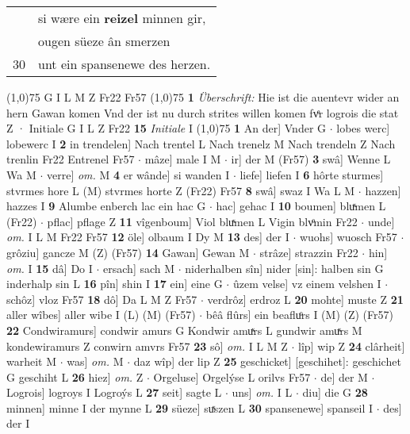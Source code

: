 \documentclass[8pt,a4paper,notitlepage]{article}
\begin{document}
\begin{table}[ht]
\begin{minipage}[t]{0.5\linewidth}
\begin{tabular}{rl}
 & si wære ein \textbf{reizel} minnen gir,\\ 
 & ougen süeze ân smerzen\\ 
30 & unt ein spansenewe des herzen.\\ 
\end{tabular}
\scriptsize
\line(1,0){75} \newline
G I L M Z Fr22 Fr57 \newline
\line(1,0){75} \newline
\textbf{1} \textit{Überschrift:} Hie ist die auentevr wider an hern Gawan komen Vnd der ist nu durch strites willen komen fvͤr logrois die stat Z  · Initiale G I L Z Fr22  \textbf{15} \textit{Initiale} I  \newline
\line(1,0){75} \newline
\textbf{1} An der] Vnder G  $\cdot$ lobes werc] lobewerc I \textbf{2} in trendelen] Nach trentel L Nach trenelz M Nach trendeln Z Nach trenlin Fr22 Entrenel Fr57  $\cdot$ mâze] male I M  $\cdot$ ir] der M (Fr57) \textbf{3} swâ] Wenne L Wa M  $\cdot$ verre] \textit{om.} M \textbf{4} er wânde] si wanden I  $\cdot$ liefe] liefen I \textbf{6} hôrte sturmes] stvrmes hore L (M) stvrmes horte Z (Fr22) Fr57 \textbf{8} swâ] swaz I Wa L M  $\cdot$ hazzen] hazzes I \textbf{9} Alumbe enberch lac ein hac G  $\cdot$ hac] gehac I \textbf{10} boumen] bluͯmen L (Fr22)  $\cdot$ pflac] pflage Z \textbf{11} vîgenboum] Viol bluͯmen L Vigin blvͦmin Fr22  $\cdot$ unde] \textit{om.} I L M Fr22 Fr57 \textbf{12} öle] olbaum I Dy M \textbf{13} des] der I  $\cdot$ wuohs] wuosch Fr57  $\cdot$ grôziu] gancze M (Z) (Fr57) \textbf{14} Gawan] Gewan M  $\cdot$ strâze] strazzin Fr22  $\cdot$ hin] \textit{om.} I \textbf{15} dâ] Do I  $\cdot$ ersach] sach M  $\cdot$ niderhalben sîn] nider [sin]: halben sin G inderhalp sin L \textbf{16} pîn] shin I \textbf{17} ein] eine G  $\cdot$ ûzem velse] vz einem velshen I  $\cdot$ schôz] vloz Fr57 \textbf{18} dô] Da L M Z Fr57  $\cdot$ verdrôz] erdroz L \textbf{20} mohte] muste Z \textbf{21} aller wîbes] aller wibe I (L) (M) (Fr57)  $\cdot$ bêâ flûrs] ein beafluͦrs I (M) (Z) (Fr57) \textbf{22} Condwiramurs] condwir amurs G Kondwir amuͯrs L gundwir amuͯrs M kondewiramurs Z conwirn amvrs Fr57 \textbf{23} sô] \textit{om.} I L M Z  $\cdot$ lîp] wip Z \textbf{24} clârheit] warheit M  $\cdot$ was] \textit{om.} M  $\cdot$ daz wîp] der lip Z \textbf{25} geschicket] [geschihet]: geschichet G geschiht L \textbf{26} hiez] \textit{om.} Z  $\cdot$ Orgeluse] Orgelýse L orilvs Fr57  $\cdot$ de] der M  $\cdot$ Logrois] logroys I Logroýs L \textbf{27} seit] sagte L  $\cdot$ uns] \textit{om.} I L  $\cdot$ diu] die G \textbf{28} minnen] minne I der mynne L \textbf{29} süeze] suͯszen L \textbf{30} spansenewe] spanseil I  $\cdot$ des] der I \newline

\end{minipage}
\end{table}
\end{document}

